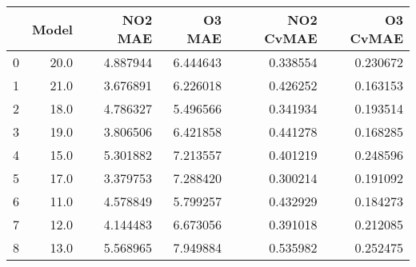 \begin{tabular}{lrrrrr}
\toprule
{} &  Model &   NO2 MAE &    O3 MAE &  NO2 CvMAE &  O3 CvMAE \\
\midrule
0 &   20.0 &  4.887944 &  6.444643 &   0.338554 &  0.230672 \\
1 &   21.0 &  3.676891 &  6.226018 &   0.426252 &  0.163153 \\
2 &   18.0 &  4.786327 &  5.496566 &   0.341934 &  0.193514 \\
3 &   19.0 &  3.806506 &  6.421858 &   0.441278 &  0.168285 \\
4 &   15.0 &  5.301882 &  7.213557 &   0.401219 &  0.248596 \\
5 &   17.0 &  3.379753 &  7.288420 &   0.300214 &  0.191092 \\
6 &   11.0 &  4.578849 &  5.799257 &   0.432929 &  0.184273 \\
7 &   12.0 &  4.144483 &  6.673056 &   0.391018 &  0.212085 \\
8 &   13.0 &  5.568965 &  7.949884 &   0.535982 &  0.252475 \\
\bottomrule
\end{tabular}
